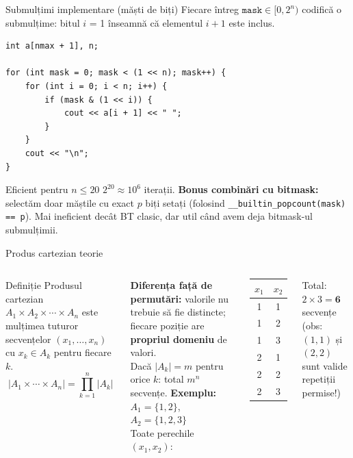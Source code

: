 ﻿\documentclass[10pt]{beamer}
\begin{document}
\begin{frame}[fragile]{Submulțimi \textemdash{} implementare (măști de biți)}
  Fiecare întreg $\texttt{mask} \in [0, 2^n)$ codifică o submulțime:
  bitul $i$ = 1 înseamnă că elementul $i+1$ este inclus.
  \begin{lstlisting}
int a[nmax + 1], n;

for (int mask = 0; mask < (1 << n); mask++) {
    for (int i = 0; i < n; i++) {
        if (mask & (1 << i)) {
            cout << a[i + 1] << " ";
        }
    }
    cout << "\n";
}
  \end{lstlisting}
  Eficient pentru $n \leq 20$ \textemdash{} $2^{20} \approx 10^6$ iterații.
  \smallskip
  \textbf{Bonus \textemdash{} combinări cu bitmask:} selectăm doar măștile cu exact
  $p$ biți setați (folosind \texttt{\_\_builtin\_popcount(mask) == p}).
  Mai ineficient decât BT clasic, dar util când avem deja bitmask-ul submulțimii.
\end{frame}

\begin{frame}{Produs cartezian \textemdash{} teorie}
  \begin{columns}[T]
  \begin{block}{Definiție}
    Produsul cartezian $A_1 \times A_2 \times \cdots \times A_n$ este mulțimea
    tuturor secvențelor $(x_1, \ldots, x_n)$ cu $x_k \in A_k$ pentru fiecare $k$.
    $$|A_1 \times \cdots \times A_n| = \prod_{k=1}^{n} |A_k|$$
  \end{block}
  \smallskip
  \textbf{Diferența față de permutări:} valorile nu trebuie să fie distincte;
  fiecare poziție are \textbf{propriul domeniu} de valori.\\[4pt]
  Dacă $|A_k| = m$ pentru orice $k$: total $m^n$ secvențe.
  \textbf{Exemplu:} $A_1 = \{1,2\}$, $A_2 = \{1,2,3\}$\\[4pt]
  Toate perechile $(x_1, x_2)$:
  \begin{center}
  \begin{tabular}{cc}
    \toprule
    $x_1$ & $x_2$ \\
    \midrule
    1 & 1 \\
    1 & 2 \\
    1 & 3 \\
    2 & 1 \\
    2 & 2 \\
    2 & 3 \\
    \bottomrule
  \end{tabular}
  \end{center}
  Total: $2 \times 3 = \mathbf{6}$ secvențe\\
  \small(obs: $(1,1)$ și $(2,2)$ sunt valide \textemdash{} repetiții permise!)
  \end{columns}
\end{frame}
\end{document}
